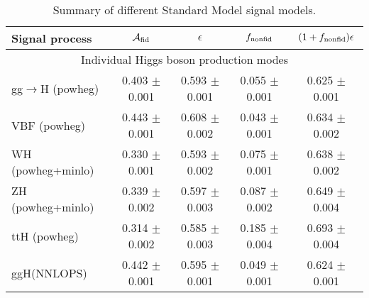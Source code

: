 \begin{table}[!h!tb]
\begin{center}
\small
\caption{
Summary of different Standard Model signal models.
\label{tab:summarySM}
}
\begin{tabular}{|l|c|c|c|c|} \hline \hline 
\textbf{Signal process} & $\mathcal{A}_{\rm fid}$ & $\epsilon$ & $f_{\rm nonfid}$  & $(1+f_{\rm nonfid})\epsilon$ \\ \hline \hline 
\multicolumn{5}{|c|}{Individual Higgs boson production modes} \\ \hline 
gg$\rightarrow$H ({\sc powheg})  & 0.403 $\pm$ 0.001 & 0.593 $\pm$ 0.001 & 0.055 $\pm$ 0.001 & 0.625 $\pm$ 0.001 \\ 
 VBF ({\sc powheg})  & 0.443 $\pm$ 0.001 & 0.608 $\pm$ 0.002 & 0.043 $\pm$ 0.001 & 0.634 $\pm$ 0.002 \\ 
 WH ({\sc powheg+minlo}) & 0.330 $\pm$ 0.001 & 0.593 $\pm$ 0.002 & 0.075 $\pm$ 0.001 & 0.638 $\pm$ 0.002 \\ 
 ZH ({\sc powheg+minlo})  & 0.339 $\pm$ 0.002 & 0.597 $\pm$ 0.003 & 0.087 $\pm$ 0.002 & 0.649 $\pm$ 0.004 \\ 
 ttH ({\sc powheg}) & 0.314 $\pm$ 0.002 & 0.585 $\pm$ 0.003 & 0.185 $\pm$ 0.004 & 0.693 $\pm$ 0.004 \\ 
 ggH(NNLOPS) & 0.442 $\pm$ 0.001 & 0.595 $\pm$ 0.001 & 0.049 $\pm$ 0.001 & 0.624 $\pm$ 0.001 \\ 
 
\hline \hline
\end{tabular}
\normalsize
\end{center}
\end{table}
 
 
 
